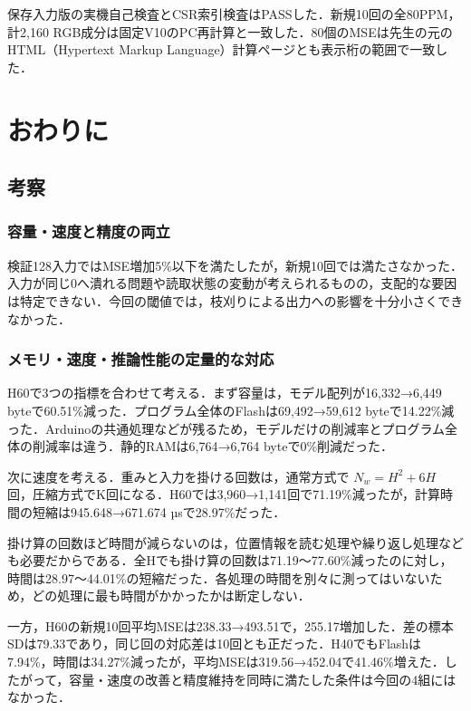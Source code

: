 \documentclass[
  10pt,
  a4paper,
]{article}
\begin{document}
保存入力版の実機自己検査とCSR索引検査はPASSした．新規10回の全80PPM，計2,160
RGB成分は固定V10のPC再計算と一致した．80個のMSEは先生の元のHTML（Hypertext
Markup Language）計算ページとも表示桁の範囲で一致した．

\section{おわりに}\label{ux304aux308fux308aux306b}

\subsection{考察}\label{ux8003ux5bdf}

\subsubsection{容量・速度と精度の両立}\label{ux5bb9ux91cfux901fux5ea6ux3068ux7cbeux5ea6ux306eux4e21ux7acb}

検証128入力ではMSE増加5\%以下を満たしたが，新規10回では満たさなかった．入力が同じ0へ潰れる問題や読取状態の変動が考えられるものの，支配的な要因は特定できない．今回の閾値では，枝刈りによる出力への影響を十分小さくできなかった．

\subsubsection{メモリ・速度・推論性能の定量的な対応}\label{ux30e1ux30e2ux30eaux901fux5ea6ux63a8ux8ad6ux6027ux80fdux306eux5b9aux91cfux7684ux306aux5bfeux5fdc}

H60で3つの指標を合わせて考える．まず容量は，モデル配列が16,332→6,449
byteで60.51\%減った．プログラム全体のFlashは69,492→59,612
byteで14.22\%減った．Arduinoの共通処理などが残るため，モデルだけの削減率とプログラム全体の削減率は違う．静的RAMは6,764→6,764
byteで0\%削減だった．

次に速度を考える．重みと入力を掛ける回数は，通常方式で \(N_w=H^2+6H\)
回，圧縮方式でK回になる．H60では3,960→1,141回で71.19\%減ったが，計算時間の短縮は945.648→671.674
µsで28.97\%だった．

掛け算の回数ほど時間が減らないのは，位置情報を読む処理や繰り返し処理なども必要だからである．全Hでも掛け算の回数は71.19〜77.60\%減ったのに対し，時間は28.97〜44.01\%の短縮だった．各処理の時間を別々に測ってはいないため，どの処理に最も時間がかかったかは断定しない．

一方，H60の新規10回平均MSEは238.33→493.51で，255.17増加した．差の標本SDは79.33であり，同じ回の対応差は10回とも正だった．H40でもFlashは7.94\%，時間は34.27\%減ったが，平均MSEは319.56→452.04で41.46\%増えた．したがって，容量・速度の改善と精度維持を同時に満たした条件は今回の4組にはなかった．
\end{document}
